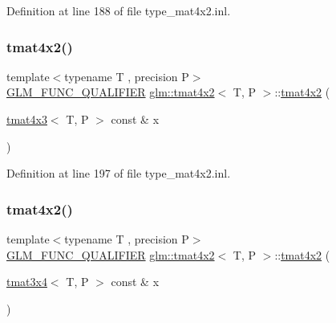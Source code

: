 Definition at line 188 of file type\+\_\+mat4x2.\+inl.

\mbox{\label{structglm_1_1tmat4x2_abff28f46da0c6abed7b296042b5a55c3}} 
\subsubsection{\texorpdfstring{tmat4x2()}{tmat4x2()}\hspace{0.1cm}{\footnotesize\ttfamily [17/22]}}
{\footnotesize\ttfamily template$<$typename T , precision P$>$ \\
\mbox{\hyperlink{setup_8hpp_a33fdea6f91c5f834105f7415e2a64407}{G\+L\+M\+\_\+\+F\+U\+N\+C\+\_\+\+Q\+U\+A\+L\+I\+F\+I\+ER}} \mbox{\hyperlink{structglm_1_1tmat4x2}{glm\+::tmat4x2}}$<$ T, P $>$\+::\mbox{\hyperlink{structglm_1_1tmat4x2}{tmat4x2}} (\begin{DoxyParamCaption}\item[{\mbox{\hyperlink{structglm_1_1tmat4x3}{tmat4x3}}$<$ T, P $>$ const \&}]{x }\end{DoxyParamCaption})}



Definition at line 197 of file type\+\_\+mat4x2.\+inl.

\mbox{\label{structglm_1_1tmat4x2_a5cf8d107788e7d1e366a6e4abdad0612}} 
\subsubsection{\texorpdfstring{tmat4x2()}{tmat4x2()}\hspace{0.1cm}{\footnotesize\ttfamily [18/22]}}
{\footnotesize\ttfamily template$<$typename T , precision P$>$ \\
\mbox{\hyperlink{setup_8hpp_a33fdea6f91c5f834105f7415e2a64407}{G\+L\+M\+\_\+\+F\+U\+N\+C\+\_\+\+Q\+U\+A\+L\+I\+F\+I\+ER}} \mbox{\hyperlink{structglm_1_1tmat4x2}{glm\+::tmat4x2}}$<$ T, P $>$\+::\mbox{\hyperlink{structglm_1_1tmat4x2}{tmat4x2}} (\begin{DoxyParamCaption}\item[{\mbox{\hyperlink{structglm_1_1tmat3x4}{tmat3x4}}$<$ T, P $>$ const \&}]{x }\end{DoxyParamCaption})}



